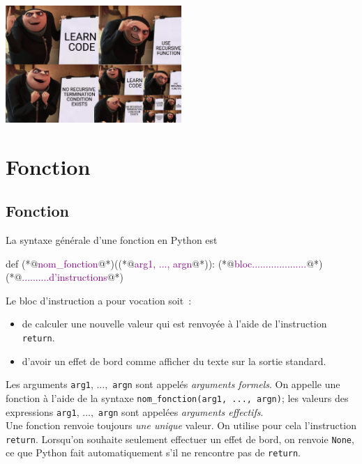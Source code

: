 \documentclass{magnoliaold}
\begin{document}
\hfill\includegraphics[width=0.5\textwidth]{../../Commun/Images/python-cours-recursion}
\magtoc

\section{Fonction}

\subsection{Fonction}

La syntaxe générale d'une fonction en Python est
\begin{pythoncode}
def (*@\textcolor{purple}{nom\_fonction}@*)((*@\textcolor{purple}{arg1, ..., argn}@*)):
    (*@\textcolor{purple}{bloc....................}@*)
    (*@\textcolor{purple}{..........d'instructions}@*)
\end{pythoncode}

\noindent
Le bloc d'instruction a pour vocation soit~:
\begin{itemize}
\item de calculer une nouvelle valeur qui est renvoyée à l'aide
de l'instruction \verb_return_.
\item d'avoir un effet de bord comme afficher du texte
sur la sortie standard.
\end{itemize}
Les arguments \verb_arg1_, $\ldots,$ \verb_argn_ sont appelés
\emph{arguments formels}. On appelle une fonction à l'aide de la syntaxe
\verb!nom_fonction(arg1, ..., argn)!; les valeurs des expressions
\verb_arg1_, $\ldots,$ \verb_argn_ sont appelées \emph{arguments effectifs}.\\

Une fonction
renvoie toujours \emph{une unique} valeur. On utilise pour cela l'instruction \verb!return!. Lorsqu'on souhaite seulement effectuer un effet de bord, on renvoie \verb!None!, ce que
Python fait automatiquement s'il ne rencontre pas de \verb!return!.\\
\end{document}
